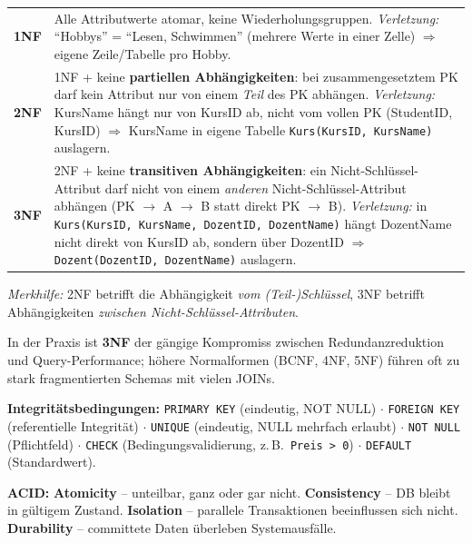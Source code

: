\begin{table}[H]
  \centering
  \begin{tabularx}{\linewidth}{L{1.6cm} L{12.4cm}}
    \textbf{1NF} & Alle Attributwerte atomar, keine Wiederholungsgruppen. \textit{Verletzung:} ``Hobbys'' = ``Lesen, Schwimmen'' (mehrere Werte in einer Zelle) $\Rightarrow$ eigene Zeile/Tabelle pro Hobby. \\
    \textbf{2NF} & 1NF + keine \textbf{partiellen Abhängigkeiten}: bei zusammengesetztem PK darf kein Attribut nur von einem \emph{Teil} des PK abhängen. \textit{Verletzung:} KursName hängt nur von KursID ab, nicht vom vollen PK (StudentID, KursID) $\Rightarrow$ KursName in eigene Tabelle \texttt{Kurs(KursID, KursName)} auslagern. \\
    \textbf{3NF} & 2NF + keine \textbf{transitiven Abhängigkeiten}: ein Nicht-Schlüssel-Attribut darf nicht von einem \emph{anderen} Nicht-Schlüssel-Attribut abhängen (PK $\to$ A $\to$ B statt direkt PK $\to$ B). \textit{Verletzung:} in \texttt{Kurs(KursID, KursName, DozentID, DozentName)} hängt DozentName nicht direkt von KursID ab, sondern über DozentID $\Rightarrow$ \texttt{Dozent(DozentID, DozentName)} auslagern. \\
  \end{tabularx}
\end{table}
\textit{Merkhilfe:} 2NF betrifft die Abhängigkeit \emph{vom (Teil-)Schlüssel}, 3NF betrifft Abhängigkeiten \emph{zwischen Nicht-Schlüssel-Attributen}.

In der Praxis ist \textbf{3NF} der gängige Kompromiss zwischen Redundanzreduktion und Query-Performance; höhere Normalformen (BCNF, 4NF, 5NF) führen oft zu stark fragmentierten Schemas mit vielen JOINs.

\textbf{Integritätsbedingungen:} \texttt{PRIMARY KEY} (eindeutig, NOT NULL) $\cdot$ \texttt{FOREIGN KEY} (referentielle Integrität) $\cdot$ \texttt{UNIQUE} (eindeutig, NULL mehrfach erlaubt) $\cdot$ \texttt{NOT NULL} (Pflichtfeld) $\cdot$ \texttt{CHECK} (Bedingungsvalidierung, z.\,B.\ \texttt{Preis > 0}) $\cdot$ \texttt{DEFAULT} (Standardwert).

\textbf{ACID:} \textbf{Atomicity} -- unteilbar, ganz oder gar nicht. \textbf{Consistency} -- DB bleibt in gültigem Zustand. \textbf{Isolation} -- parallele Transaktionen beeinflussen sich nicht. \textbf{Durability} -- committete Daten überleben Systemausfälle.

